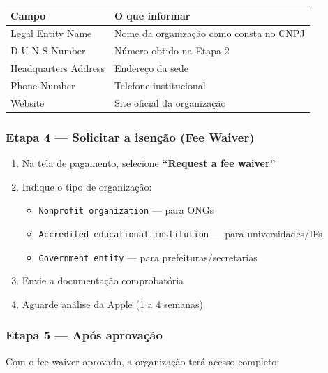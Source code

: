 \documentclass[12pt, a4paper]{article}
\begin{document}
\begin{table}[H]
\centering
\renewcommand{\arraystretch}{1.3}
\begin{tabularx}{0.85\textwidth}{|l|X|}
\hline
\rowcolor{verdeE}
\textbf{\color{white}Campo} & \textbf{\color{white}O que informar} \\
\hline
Legal Entity Name & Nome da organiza\c{c}\~ao como consta no CNPJ \\
\hline
\rowcolor{cinzaC}
D-U-N-S Number & N\'umero obtido na Etapa 2 \\
\hline
Headquarters Address & Endere\c{c}o da sede \\
\hline
\rowcolor{cinzaC}
Phone Number & Telefone institucional \\
\hline
Website & Site oficial da organiza\c{c}\~ao \\
\hline
\end{tabularx}
\end{table}

\subsubsection{Etapa 4 --- Solicitar a isen\c{c}\~ao (Fee Waiver)}

\begin{enumerate}
  \item Na tela de pagamento, selecione \textbf{``Request a fee waiver''}
  \item Indique o tipo de organiza\c{c}\~ao:
    \begin{itemize}
      \item \texttt{Nonprofit organization} --- para ONGs
      \item \texttt{Accredited educational institution} --- para universidades/IFs
      \item \texttt{Government entity} --- para prefeituras/secretarias
    \end{itemize}
  \item Envie a documenta\c{c}\~ao comprobat\'oria
  \item Aguarde an\'alise da Apple (1 a 4 semanas)
\end{enumerate}

\subsubsection{Etapa 5 --- Ap\'os aprova\c{c}\~ao}

Com o fee waiver aprovado, a organiza\c{c}\~ao ter\'a acesso completo:
\end{document}
